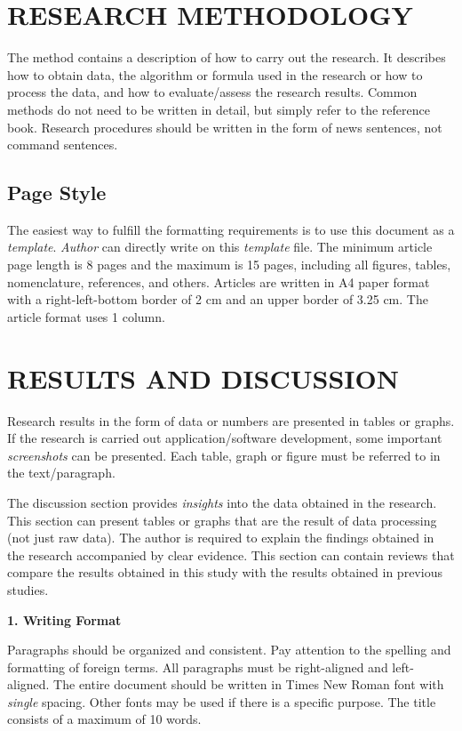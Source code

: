 \documentclass[11pt]{article}
\begin{document}
\section{RESEARCH METHODOLOGY}

The method contains a description of how to carry out the research. It describes how to obtain data, the algorithm or formula used in the research or how to process the data, and how to evaluate/assess the research results. Common methods do not need to be written in detail, but simply refer to the reference book. Research procedures should be written in the form of news sentences, not command sentences.

\subsection{Page Style}

The easiest way to fulfill the formatting requirements is to use this document as a \textit{template}. \textit{Author} can directly write on this \textit{template} file. The minimum article page length is 8 pages and the maximum is 15 pages, including all figures, tables, nomenclature, references, and others. Articles are written in A4 paper format with a right-left-bottom border of 2 cm and an upper border of 3.25 cm. The article format uses 1 column.

\section{RESULTS AND DISCUSSION}

Research results in the form of data or numbers are presented in tables or graphs. If the research is carried out application/software development, some important \textit{screenshots} can be presented. Each table, graph or figure must be referred to in the text/paragraph.

The discussion section provides \textit{insights} into the data obtained in the research. This section can present tables or graphs that are the result of data processing (not just raw data). The author is required to explain the findings obtained in the research accompanied by clear evidence. This section can contain reviews that compare the results obtained in this study with the results obtained in previous studies.

\noindent\textbf{1. Writing Format}

Paragraphs should be organized and consistent. Pay attention to the spelling and formatting of foreign terms. All paragraphs must be right-aligned and left-aligned. The entire document should be written in Times New Roman font with \textit{single} spacing. Other fonts may be used if there is a specific purpose. The title consists of a maximum of 10 words.
\end{document}
